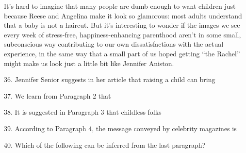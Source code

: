 \qquad It's hard to imagine that many people are dumb enough to want children just because Reese and Angelina make it look so glamorous: most adults understand that a baby is not a haircut. But it's interesting to wonder if the images we see every week of stress-free, happiness-enhancing parenthood aren't in some small, subconscious way contributing to our own dissatisfactions with the actual experience, in the same way that a small part of us hoped getting ``the Rachel'' might make us look just a little bit like Jennifer Aniston.

\vspace{6pt}


36. Jennifer Senior suggests in her article that raising a child can bring\par

37. We learn from Paragraph 2 that\par

38. It is suggested in Paragraph 3 that childless folks\par

39. According to Paragraph 4, the message conveyed by celebrity magazines is\par

40. Which of the following can be inferred from the last paragraph?\par
